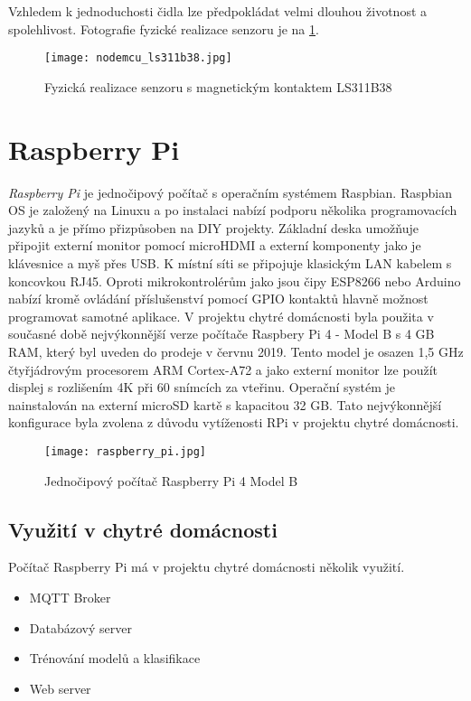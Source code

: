 Vzhledem k jednoduchosti čidla lze předpokládat velmi dlouhou životnost a spolehlivost. Fotografie fyzické realizace senzoru je na \cref{fig:nodemcu_ls311b38}.

\begin{figure}[H]
  \centering
  \texttt{[image: nodemcu\_ls311b38.jpg]}
  \caption{Fyzická realizace senzoru s magnetickým kontaktem LS311B38}
  \label{fig:nodemcu_ls311b38}
\end{figure} 

\section{Raspberry Pi} \label{sec:raspberry_pi}
\textit{Raspberry Pi} je jednočipový počítač s operačním systémem Raspbian. Raspbian OS je založený na Linuxu a po instalaci nabízí podporu několika programovacích jazyků a je přímo přizpůsoben na DIY projekty. Základní deska umožňuje připojit externí monitor pomocí microHDMI a externí komponenty jako je klávesnice a myš přes USB. K místní síti se připojuje klasickým LAN kabelem s koncovkou RJ45. Oproti mikrokontrolérům jako jsou čipy ESP8266 nebo Arduino nabízí kromě ovládání příslušenství pomocí GPIO kontaktů hlavně možnost programovat samotné aplikace. V projektu chytré domácnosti byla použita v současné době nejvýkonnější verze počítače Raspbery Pi 4 - Model B s 4 GB RAM, který byl uveden do prodeje v červnu 2019. Tento model je osazen 1,5 GHz čtyřjádrovým procesorem ARM Cortex-A72 a jako externí monitor lze použít displej s rozlišením 4K při 60 snímcích za vteřinu. Operační systém je nainstalován na externí microSD kartě s kapacitou 32 GB. Tato nejvýkonnější konfigurace byla zvolena z důvodu vytíženosti RPi v projektu chytré domácnosti. 

\begin{figure}[H]
  \centering
  \texttt{[image: raspberry\_pi.jpg]}
  \caption{Jednočipový počítač Raspberry Pi 4 Model B}
  \label{fig:raspberry_pi}
\end{figure} 

\subsection*{Využití v chytré domácnosti}
Počítač Raspberry Pi má v projektu chytré domácnosti několik využití. 

\begin{itemize}
  \item MQTT Broker
  \item Databázový server
  \item Trénování modelů a klasifikace
  \item Web server
\end{itemize}

